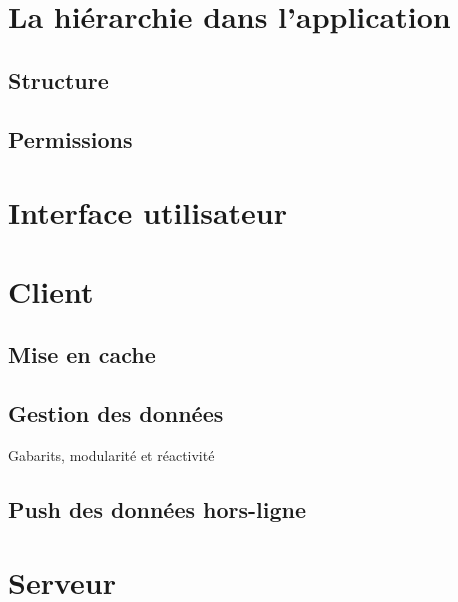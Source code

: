 \documentclass{EPL-master-thesis-covers-FR}
\begin{document}
		\section{La hiérarchie dans l'application}


			\subsection*{Structure}

			

			\subsection*{Permissions}

			

		\section{Interface utilisateur}

		\section{Client}


			\subsection*{Mise en cache}
				\label{sec:cache_client}

			
			\subsection*{Gestion des données}
				Gabarits, modularité et réactivité

			\subsection*{Push des données hors-ligne}
				\label{sec:service_worker}
				
				

			

		\section{Serveur}
			\label{sec:serveur}
\end{document}
